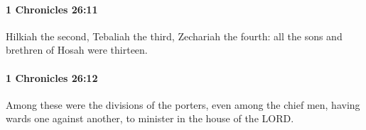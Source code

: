 		\paragraph{1 Chronicles 26:11} %
			\label{1CHRONICLES-26-11}

			Hilkiah the second, Tebaliah the third, Zechariah the fourth: all the sons and brethren of Hosah were thirteen.


		\paragraph{1 Chronicles 26:12} %
			\label{1CHRONICLES-26-12}

			Among these were the divisions of the porters, even among the chief men, having wards one against another, to minister in the house of the LORD.


